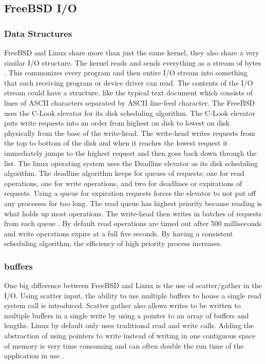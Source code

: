 \documentclass[draftclsnofoot, onecolumn, compsoc, 10pt]{IEEEtran}
\begin{document}
\subsection{FreeBSD I/O}
\subsubsection{Data Structures}
FreeBSD and Linux share more than just the same kernel, they also share a very similar I/O structure. The kernel reads and sends everything as a stream of bytes \cite{FreeBSDIO}. This commonizes every program and then entire I/O stream into something that each receiving program or device driver can read. The contents of the I/O stream could have a structure, like the typical text document which consists of lines of ASCII characters separated by ASCII line-feed character. The FreeBSD uses the C-Look elevator for its disk scheduling algorithm. The C-Look elevator puts write requests into an order from highest on disk to lowest on disk physically from the base of the write-head. The write-head writes requests from the top to bottom of the disk and when it reaches the lowest request it immediately jumps to the highest request and then goes back down through the list. The linux operating system uses the Deadline elevator as its disk scheduling algorithm. The deadline algorithm keeps for queues of requests; one for read operations, one for write operations, and two for deadlines or expirations of requests. Using a queue for expiration requests forces the elevator to not put off any processes for too long. The read queue has highest priority because reading is what holds up most operations. The write-head then writes in batches of requests from each queue \cite{DeadlineWiki}. By default read operations are timed out after 500 milliseconds and write operations expire at a full five seconds. By having a consistent scheduling algorithm, the efficiency of high priority process increases. 

\subsubsection{buffers}
One big difference between FreeBSD and Linux is the use of scatter/gather in the I/O. Using scatter input, the ability to use multiple buffers to house a single read system call is introduced. Scatter gather also allows writes to be written to multiple buffers in a single write  by using a pointer to an array of buffers and lengths. Linux by default only uses traditional read and write calls. Adding the abstraction of using pointers to write instead of writing in one contiguous space of memory is very time consuming and can often double the run time of the application in use \cite{FreeBSDIO}.
\end{document}
